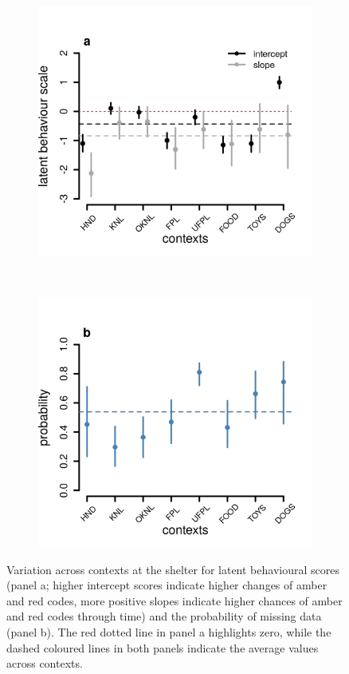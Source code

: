 \documentclass[12pt]{article}
\begin{document}
\begin{figure}[]
  \centering
  \begin{subfigure}{0.5\textwidth}
    \includegraphics[scale=0.6]{figures/figure_S1_a}
  \end{subfigure}%
  ~
  \begin{subfigure}{0.5\textwidth}
    \includegraphics[scale=0.6]{figures/figure_S1_b}
  \end{subfigure}%
\caption{Variation across contexts at the shelter for latent behavioural scores (panel a; higher intercept scores indicate higher changes of amber and red codes, more positive slopes indicate higher chances of amber and red codes through time) and the probability of missing data (panel b). The red dotted line in panel a highlights zero, while the dashed coloured lines in both panels indicate the average values across contexts.
}
\label{fig_1}
\end{figure}
\end{document}
